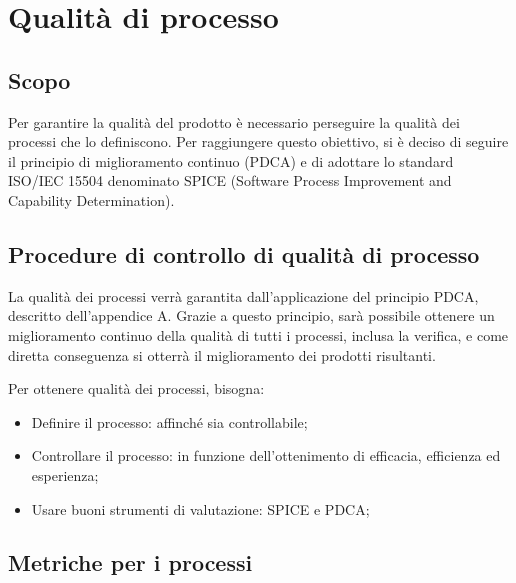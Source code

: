 \documentclass[PianoDiQualifica.tex]{subfiles}
\begin{document}
\chapter{Qualità di processo}

\section{Scopo} 
Per garantire la qualità del prodotto è necessario perseguire la qualità dei processi che lo definiscono.
Per raggiungere questo obiettivo, si è deciso di seguire il principio di miglioramento continuo (PDCA) e di adottare lo standard ISO/IEC 15504 denominato SPICE (Software Process Improvement and Capability Determination).

\section{Procedure di controllo di qualità di processo}
La qualità dei processi verrà garantita dall'applicazione del principio PDCA, descritto dell'appendice A. Grazie a questo principio, sarà possibile ottenere un miglioramento continuo della qualità di tutti i processi, inclusa la verifica, e come diretta conseguenza si otterrà il miglioramento dei prodotti risultanti. 

Per ottenere qualità dei processi, bisogna:
\begin{itemize}
	\item Definire il processo: affinché sia controllabile;
	\item Controllare il processo: in funzione dell'ottenimento di efficacia, efficienza ed esperienza;
	\item Usare buoni strumenti di valutazione: SPICE e PDCA;
\end{itemize}

\section{Metriche per i processi}%

\end{document}
